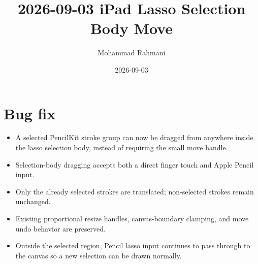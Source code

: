 \documentclass[a4paper]{article}
\title{2026-09-03 iPad Lasso Selection Body Move}
\date{2026-09-03}
\author{Mohammad Rahmani}
\begin{document}
   \maketitle

   \section{Bug fix}
   \begin{itemize}
      \item A selected PencilKit stroke group can now be dragged from anywhere inside the lasso selection body, instead of requiring the small move handle.
      \item Selection-body dragging accepts both a direct finger touch and Apple Pencil input.
      \item Only the already selected strokes are translated; non-selected strokes remain unchanged.
      \item Existing proportional resize handles, canvas-boundary clamping, and move undo behavior are preserved.
      \item Outside the selected region, Pencil lasso input continues to pass through to the canvas so a new selection can be drawn normally.
   \end{itemize}

   
   
\end{document}
